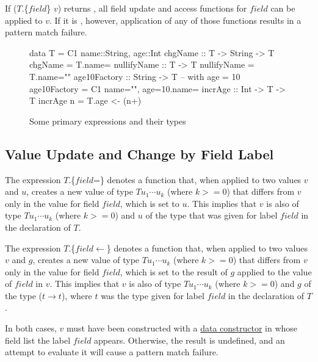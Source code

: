If ($T$.\{$field$\} $v$) returns , all field update and access functions for $field$ can be applied to $v$. If it is , however, application of any of those functions results in a pattern match failure.

\begin{figure}[hbt]
\begin{code}
data T = C1 {name::String, age::Int}
chgName :: T -> String -> T
chgName = T.{name=}
nullifyName :: T -> T
nullifyName = T.{name=""}
age10Factory :: String -> T  -- with age = 10
age10Factory = C1 {name="", age=10}.{name=}
incrAge :: Int -> T -> T
incrAge n = T.{age <- (n+)}
\end{code}
\caption{Some primary expressions and their types}
\label{primexprexample}
\end{figure}


\subsection{Value Update and Change by Field Label} \label{fiieldupd}

The expression $T$.\{$field$=\} denotes a function that, when applied to two values $v$ and $u$, creates a new value of type $T u_1 \cdots u_k$  (where $k>=0$) that differs from $v$ only in the value for field $field$, which is set to $u$.
This implies that $v$ is also of type $T u_1 \cdots u_k$  (where $k>=0$) and $u$ of the type that was given for label $field$ in the declaration of $T$.

The expression $T$.\{$field$$\leftarrow$\} denotes a function that, when applied to two values $v$ and $g$, creates a new value of type $T u_1 \cdots u_k$  (where $k>=0$) that differs from $v$ only in the value for field $field$, which is set to the result of $g$ applied to the value of $field$ in $v$.
This implies that $v$ is also of type $T u_1 \cdots u_k$  (where $k>=0$) and $g$ of the type ($t \rightarrow t$), where $t$  was the type given for label $field$ in the declaration of $T$.

In both cases, $v$ must have been constructed with a \hyperref[fieldconstructor]{data constructor} in whose field list  the label $field$ appears. Otherwise, the result is undefined, and an attempt to evaluate it will cause a pattern match failure.

